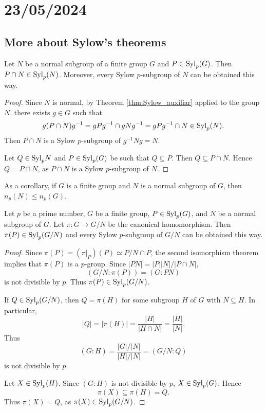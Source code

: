 \section{23/05/2024}

\subsection{More about Sylow's theorems}

\begin{theorem}
    Let $N$ be a normal subgroup of a finite group 
    $G$ and $P\in\mathrm{Syl}_p(G)$. Then 
    $P\cap N\in\mathrm{Syl}_p(N)$. Moreover, every Sylow 
    $p$-subgroup of $N$  
    can be obtained this way.
\end{theorem}

\begin{proof}
    Since $N$ is normal,
    by Theorem \ref{thm:Sylow_auxiliar} applied to the group $N$, 
    there exists 
    $g\in G$ such that 
        \[
                g(P\cap N)g^{-1}=gPg^{-1}\cap gNg^{-1}=gPg^{-1}\cap N\in\mathrm{Syl}_p(N).
        \]
    Then $P\cap N$ is a Sylow $p$-subgroup of $g^{-1}Ng=N$.

    Let $Q\in\mathrm{Syl}_pN$ and $P\in\mathrm{Syl}_p(G)$ be such that
    $Q\subseteq P$. Then
    $Q\subseteq P\cap N$. Hence 
    $Q=P\cap N$, as $P\cap N$ is a Sylow $p$-subgroup of $N$. 
\end{proof}

As a corollary, if $G$ is a finite group and 
$N$ is a normal subgroup of $G$, then 
$n_p(N)\leq n_p(G)$.

\begin{theorem}
    Let $p$ be a prime number, $G$ be a finite group, $P\in\mathrm{Syl}_p(G)$, 
    and $N$ be a normal subgroup of $G$. Let $\pi\colon G\to G/N$ be the canonical homomorphism. Then 
    $\pi(P)\in\mathrm{Syl}_p(G/N)$ and every Sylow 
    $p$-subgroup of $G/N$ can be obtained this way. 
\end{theorem}

\begin{proof}
    Since $\pi(P)=(\pi|_{P})(P)\simeq P/N\cap P$,
    the second isomorphism theorem 
    implies that 
    $\pi(P)$ is a $p$-group. Since
    $|PN|=|P||N|/|P\cap N|$,
        \[
                (G/N:\pi(P))=(G:PN)
        \]
        is not divisible by $p$. Thus $\pi(P)\in\mathrm{Syl}_p(G/N)$.

        If $Q\in\mathrm{Syl}_p(G/N)$, then $Q=\pi(H)$ for some
        subgroup $H$ of $G$
        with $N\subseteq H$. In particular,
        \[
                |Q|=|\pi(H)|=\frac{|H|}{|H\cap N|}=\frac{|H|}{|N|}.
        \]
        Thus 
        \[
                (G:H)=\frac{|G|/|N|}{|H|/|N|}=(G/N:Q)
        \]
        is not divisible by $p$. 
        
        Let $X\in\mathrm{Syl}_p(H)$. Since $(G:H)$ is not divisible by $p$, 
        $X\in\mathrm{Syl}_p(G)$. Hence 
        \[
        \pi(X)\subseteq\pi(H)=Q. 
        \]
        Thus 
        $\pi(X)=Q$, as 
        $\pi(X)\in\mathrm{Syl}_p(G/N)$.
\end{proof}

